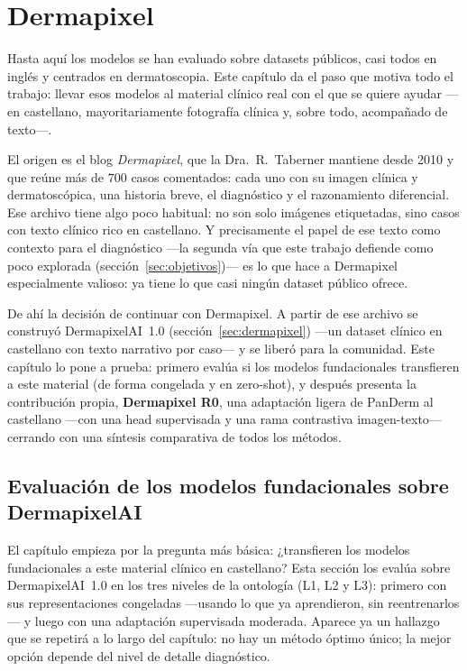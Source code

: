 
\chapter{Dermapixel}
\label{cap:dermapixel}

Hasta aquí los modelos se han evaluado sobre datasets públicos, casi
todos en inglés y centrados en dermatoscopia. Este capítulo da el paso
que motiva todo el trabajo: llevar esos modelos al material clínico
real con el que se quiere ayudar ---en castellano, mayoritariamente
fotografía clínica y, sobre todo, acompañado de texto---.

El origen es el blog \emph{Dermapixel}, que la Dra.~R.~Taberner
mantiene desde 2010 y que reúne más de $700$ casos comentados: cada
uno con su imagen clínica y dermatoscópica, una historia breve, el
diagnóstico y el razonamiento diferencial. Ese archivo tiene algo poco
habitual: no son solo imágenes etiquetadas, sino casos con texto
clínico rico en castellano. Y precisamente el papel de ese texto como
contexto para el diagnóstico ---la segunda vía que este trabajo
defiende como poco explorada (sección~\ref{sec:objetivos})--- es lo
que hace a Dermapixel especialmente valioso: ya tiene lo que casi
ningún dataset público ofrece.

De ahí la decisión de continuar con Dermapixel. A partir de ese
archivo se construyó DermapixelAI~1.0 (sección~\ref{sec:dermapixel})
---un dataset clínico en castellano con texto narrativo por caso--- y
se liberó para la comunidad. Este capítulo lo pone a prueba: primero
evalúa si los modelos fundacionales transfieren a este material (de
forma congelada y en zero-shot), y después presenta la
contribución propia, \textbf{Dermapixel R0}, una adaptación ligera de
PanDerm al castellano ---con una head supervisada y una rama
contrastiva imagen-texto--- cerrando con una síntesis comparativa de
todos los métodos.

\section{Evaluación de los modelos fundacionales sobre DermapixelAI}
\label{sec:dermapixel-results}

El capítulo empieza por la pregunta más básica: ¿transfieren los
modelos fundacionales a este material clínico en castellano? Esta
sección los evalúa sobre DermapixelAI~1.0 en los tres niveles de la
ontología (L1, L2 y L3): primero con sus representaciones congeladas
---usando lo que ya aprendieron, sin reentrenarlos--- y luego con una
adaptación supervisada moderada. Aparece ya un hallazgo que se repetirá
a lo largo del capítulo: no hay un método óptimo único; la mejor opción
depende del nivel de detalle diagnóstico.

